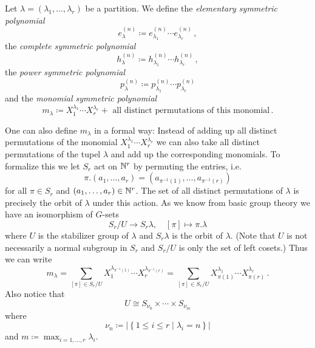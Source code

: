 \begin{defi}
  Let $\lambda = (\lambda_1, \dotsc, \lambda_r)$ be a partition. We define the \emph{elementary symmetric polynomial}
  \[
              e^{(n)}_\lambda
    \coloneqq e^{(n)}_{\lambda_1} \dotsm e^{(n)}_{\lambda_r} \,,
  \]
  the \emph{complete symmetric polynomial}
  \[
              h^{(n)}_\lambda
    \coloneqq h^{(n)}_{\lambda_1} \dotsm h^{(n)}_{\lambda_r} \,,
  \]
  the \emph{power symmetric polynomial}
  \[
              p^{(n)}_\lambda
    \coloneqq p^{(n)}_{\lambda_1} \dotsm p^{(n)}_{\lambda_r}
  \]
  and the \emph{monomial symmetric polynomial}
  \[
              m_\lambda
    \coloneqq   X_1^{\lambda_1} \dotsm X_r^{\lambda_r}
              + \text{ all distinct permutations of this monomial} \,.
  \]
\end{defi}


One can also define $m_\lambda$ in a formal way:
Instead of adding up all distinct permutations of the monomial $X_1^{\lambda_1} \dotsm X_r^{\lambda_r}$ we can also take all distinct permutations of the tupel $\lambda$ and add up the corresponding monomials.
To formalize this we let $S_r$ act on $\mathbb{N}^r$ by permuting the entries, i.e.\
\[
    \pi.(a_1, \dotsc, a_r)
  = \left( a_{\pi^{-1}(1)}, \dotsc, a_{\pi^{-1}(r)} \right)
\]
for all $\pi \in S_r$ and $(a_1, \dotsc, a_r) \in \mathbb{N}^r$.
The set of all distinct permutations of $\lambda$ is precisely the orbit of $\lambda$ under this action.
As we know from basic group theory we have an isomorphism of $G$-sets
\[
          S_r / U
  \to     S_r \lambda,
  \quad   [\pi]
  \mapsto \pi.\lambda
\]
where $U$ is the stabilizer group of $\lambda$ and $S_r \lambda$ is the orbit of $\lambda$.
(Note that $U$ is not necessarily a normal subgroup in $S_r$ and $S_r/U$ is only the set of left cosets.)
Thus we can write
\[
    m_\lambda
  = \sum_{[\pi] \in S_r/U} X_1^{\lambda_{\pi^{-1}(1)}} \dotsm X_r^{\lambda_{\pi^{-1}(r)}}
  = \sum_{[\pi] \in S_r/U} X_{\pi(1)}^{\lambda_1} \dotsm X_{\pi(r)}^{\lambda_r} \,.
\]
Also notice that
\[
        U
  \cong S_{\nu_0} \times \dotsb \times S_{\nu_m}
\]
where
\[
            \nu_n
  \coloneqq \left|
              \left\{
                1 \leq i \leq r
              \mid
                  \lambda_i
                = n
              \right\}
            \right|
\]
and $m \coloneqq \max_{i=1,\dotsc,r} \lambda_i$.


